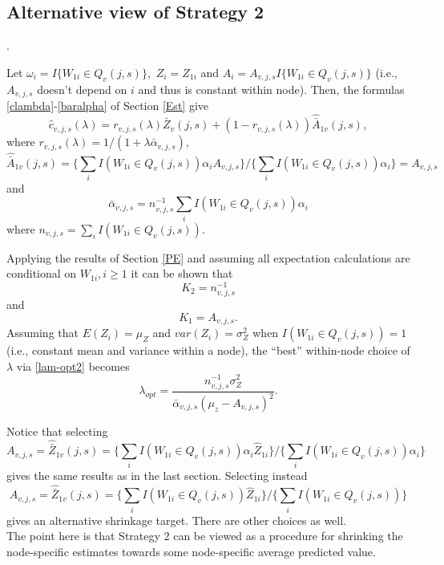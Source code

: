\documentclass[12pt]{article}
\begin{document}
\subsection{Alternative view of Strategy 2}.

Let $\omega_i = I\{ W_{1i} \in Q_{v}(j,s) \},$ $Z_i = Z_{1i}$ and $A_i
= A_{v,j,s} I\{ W_{1i} \in Q_{v}(j,s) \}$ (i.e., $A_{v,j,s}$ doesn't
depend on $i$ and thus is constant within node).  Then, the formulas
\eqref{clambda}-\eqref{baralpha} of Section \ref{Est} give
 \[
\widehat{c}_{v,j,s}(\lambda) = r_{v,j,s}(\lambda) \bar{Z}_v(j,s) +
(1-r_{v,j,s}(\lambda)) \hat{\bar{A}}_{1v}(j,s),
\]
where $r_{v,j,s}(\lambda) = 1/(1 + \lambda \bar{\alpha}_{v,j,s}),$
\[
\hat{\bar{A}}_{1v}(j,s) =
\{ \sum_i I(W_{1i} \in Q_{v}(j,s)) \alpha_i  A_{v,j,s}  \}
/ \{ \sum_i I(W_{1i} \in Q_{v}(j,s)) \alpha_i \} = A_{v,j,s}
\]
and
\[
\bar{\alpha}_{v,j,s} =  n^{-1}_{v,j,s} \sum_i I(W_{1i} \in Q_{v}(j,s)) \alpha_i
\]
where $n_{v,j,s} =  \sum_i I( W_{1i} \in Q_{v}(j,s) ).$

Applying the results of Section \ref{PE} and assuming all expectation
calculations are conditional on $W_{1i}, i \geq 1$ it can be shown that
\[
K_2 = n^{-1}_{v,j,s}
\]
and
\[
K_1 = A_{v,j,s}.
\]
Assuming that $E(Z_i) = \mu_Z$ and $var(Z_i) = \sigma^2_Z$ when $I(
W_{1i} \in Q_{v}(j,s) ) =1$ (i.e., constant mean and variance within a
node), the ``best'' within-node choice of $\lambda$ via
\eqref{lam-opt2} becomes
\[
\lambda_{opt} = \frac{n^{-1}_{v,j,s} \sigma^2_Z}{ \bar{\alpha}_{v,j,s} (\mu_z -  A_{v,j,s})^2}.
\]

Notice that selecting
\[
A_{v,j,s} = \hat{\bar{Z}}_{1v}(j,s) =
\{ \sum_i I(W_{1i} \in Q_{v}(j,s)) \alpha_i  \hat{Z}_{1i} \}
/ \{ \sum_i I(W_{1i} \in Q_{v}(j,s)) \alpha_i \}
\]
gives the same results as in the last section. Selecting instead
\[
A_{v,j,s} = \hat{\bar{Z}}_{1v}(j,s) =
\{ \sum_i I(W_{1i} \in Q_{v}(j,s))  \hat{Z}_{1i} \}
/ \{ \sum_i I(W_{1i} \in Q_{v}(j,s))  \}
\]
gives an alternative shrinkage target.  There are other choices as well.\\

The point here is that Strategy 2 can be viewed as a procedure for
shrinking the node-specific estimates towards some node-specific
average predicted value.
\end{document}
